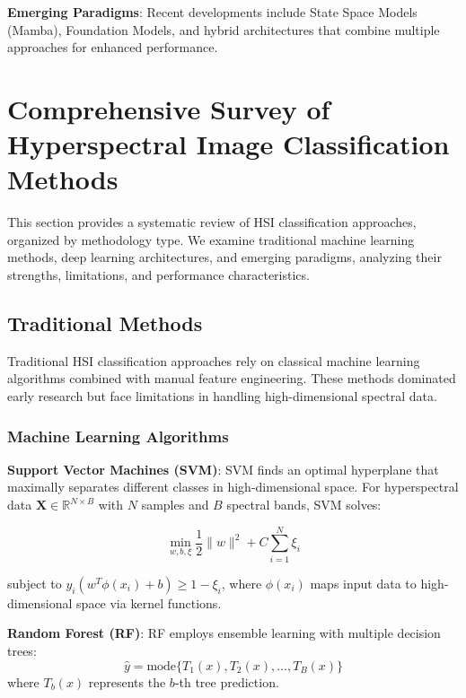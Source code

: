 \documentclass[journal]{IEEEtran}
\begin{document}
\textbf{Emerging Paradigms}: Recent developments include State Space Models (Mamba), Foundation Models, and hybrid architectures that combine multiple approaches for enhanced performance.



\section{Comprehensive Survey of Hyperspectral Image Classification Methods}

This section provides a systematic review of HSI classification approaches, organized by methodology type. We examine traditional machine learning methods, deep learning architectures, and emerging paradigms, analyzing their strengths, limitations, and performance characteristics.



\subsection{Traditional Methods}

Traditional HSI classification approaches rely on classical machine learning algorithms combined with manual feature engineering. These methods dominated early research but face limitations in handling high-dimensional spectral data.

\subsubsection{Machine Learning Algorithms}

\textbf{Support Vector Machines (SVM)}: SVM finds an optimal hyperplane that maximally separates different classes in high-dimensional space. For hyperspectral data $\mathbf{X} \in \mathbb{R}^{N \times B}$ with $N$ samples and $B$ spectral bands, SVM solves:

\begin{equation}
\min_{w,b,\xi} \frac{1}{2}\|w\|^2 + C\sum_{i=1}^{N}\xi_i
\end{equation}

subject to $y_i(w^T\phi(x_i) + b) \geq 1 - \xi_i$, where $\phi(x_i)$ maps input data to high-dimensional space via kernel functions.

\textbf{Random Forest (RF)}: RF employs ensemble learning with multiple decision trees:
\begin{equation}
\hat{y} = \text{mode}\{T_1(x), T_2(x), \ldots, T_B(x)\}
\end{equation}
where $T_b(x)$ represents the $b$-th tree prediction.
\end{document}
